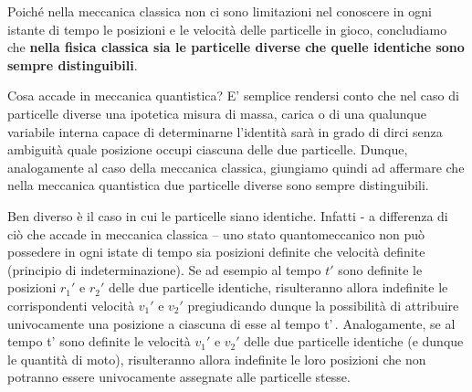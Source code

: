 Poiché nella meccanica classica non ci sono limitazioni nel conoscere in
ogni istante di tempo le posizioni e le velocità delle particelle in
gioco, concludiamo che \textbf{nella fisica classica sia le particelle
	diverse che quelle identiche sono sempre distinguibili}.

Cosa accade in meccanica quantistica?
E' semplice rendersi conto che nel
caso di particelle diverse una ipotetica misura di massa, carica o di
una qualunque variabile interna capace di determinarne l'identità sarà
in grado di dirci senza ambiguità quale posizione occupi ciascuna delle
due particelle.
Dunque, analogamente al caso della meccanica classica,
giungiamo quindi ad affermare che nella meccanica quantistica due
particelle diverse sono sempre distinguibili.

Ben diverso è il caso in cui le particelle siano identiche.
Infatti - a
differenza di ciò che accade in meccanica classica -- uno stato
quantomeccanico non può possedere in ogni istate di tempo sia posizioni
definite che velocità definite (principio di indeterminazione).
Se ad
esempio al tempo \(t'\) sono definite le posizioni \(r_{1}'\) e
\(r_{2}'\) delle due particelle identiche, risulteranno allora
indefinite le corrispondenti velocità \(v_{1}'\) e \(v_{2}'\)
pregiudicando dunque la possibilità di attribuire univocamente una
posizione a ciascuna di esse al tempo t'\,. Analogamente, se al tempo
t' sono definite le velocità \(v_{1}'\) e \(v_{2}'\) delle due
particelle identiche (e dunque le quantità di moto), risulteranno allora
indefinite le loro posizioni che non potranno essere univocamente
assegnate alle particelle stesse.

